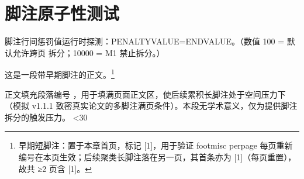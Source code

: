 \documentclass[doctor]{htuthesis}
\begin{document}
\frontmatter
\tableofcontents            %

\mainmatter

\chapter*{脚注原子性测试}

脚注行间惩罚值运行时探测：PENALTYVALUE=\the\interfootnotelinepenalty ENDVALUE。（数值 100 = 默认允许跨页
拆分；10000 = M1 禁止拆分。）

这是一段带早期脚注的正文。\footnote{早期短脚注：置于本章首页，标记 [1]，用于验证 footmisc perpage
每页重新编号在本页生效；后续聚类长脚注落在另一页，其首条亦为 [1]（每页重置），故共 ≥2 页含 [1]。}

\setcounter{filler@a}{0}
\loop
{}
正文填充段落编号 ，用于填满页面正文区，使后续累积长脚注处于空间压力下（模拟 v1.1.1
致密真实论文的多脚注满页条件）。本段无学术意义，仅为提供脚注拆分的触发压力。
\ifnum\value{filler@a}<30 \repeat
\end{document}
